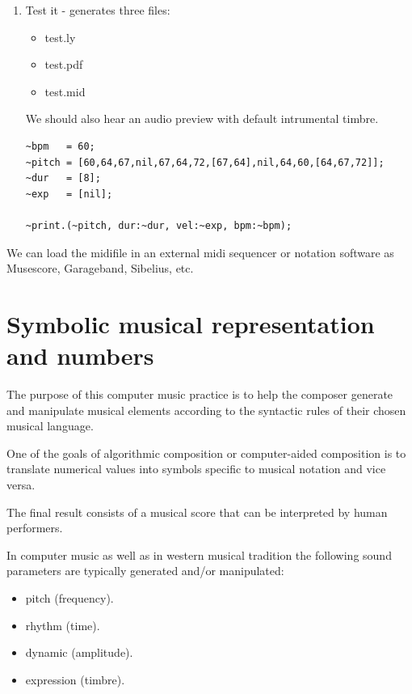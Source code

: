 \begin{enumerate}
\item Test it - generates three files:

\begin{itemize}
\tightlist
\item test.ly
\item test.pdf
\item test.mid
\end{itemize}

We should also hear an audio preview with default intrumental timbre.

\begin{lstlisting}[frame=single] 
~bpm   = 60;
~pitch = [60,64,67,nil,67,64,72,[67,64],nil,64,60,[64,67,72]];
~dur   = [8];
~exp   = [nil];

~print.(~pitch, dur:~dur, vel:~exp, bpm:~bpm);
\end{lstlisting}
\end{enumerate}

We can load the midifile in an external midi sequencer or notation software as Musescore, Garageband, Sibelius, etc.

\section{Symbolic musical representation and numbers}\label{symbolic-musical-representation-and-numbers}

The purpose of this computer music practice is to help the composer generate and manipulate musical elements according to the syntactic rules of their chosen musical language.

One of the goals of algorithmic composition or computer-aided composition is to translate numerical values \hspace{0pt}\hspace{0pt}into symbols specific to musical notation and vice versa.

The final result consists of a musical score that can be interpreted by human performers.

In computer music as well as in western musical tradition the following sound parameters are typically generated and/or manipulated:

\begin{itemize}
\tightlist
\item pitch (frequency).
\item rhythm (time).
\item dynamic (amplitude).
\item expression (timbre).
\end{itemize}

